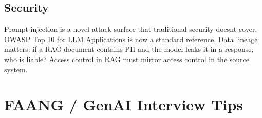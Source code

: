 \documentclass[11pt]{article}
\begin{document}
\subsection{Security}\label{security}

Prompt injection is a novel attack surface that traditional security doesn\textquotesingle t cover. OWASP Top 10 for LLM Applications is now a standard reference. Data lineage matters: if a RAG document contains PII and the model leaks it in a response, who is liable? Access control in RAG must mirror access control in the source system.

\section{FAANG / GenAI Interview Tips}\label{faang--genai-interview-tips}
\end{document}
